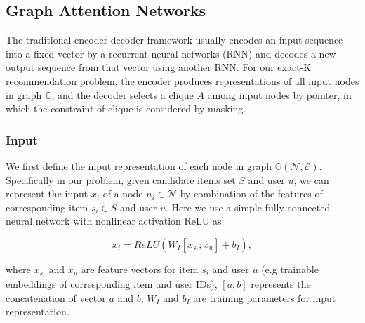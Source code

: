 \subsection{Graph Attention Networks}
\label{sec:gattn}
The traditional encoder-decoder framework \cite{sutskever2014sequence} usually encodes an input sequence into a fixed vector by a recurrent neural networks (RNN)
and decodes a new output sequence from that vector using another RNN. 
For our exact-K recommendation problem, the encoder produces representations of all input nodes in graph $\mathbb{G}$, 
and the decoder selects a clique $A$ among input nodes by pointer, in which the constraint of clique is considered by masking.

\subsubsection{Input}
\label{sec:input}
We first define the input representation of each node in graph $\mathbb{G}(\mathcal{N},\mathcal{E})$.
Specifically in our problem, given candidate items set $S$ and user $u$,
we can represent the input $x_i$ of a node $n_i\in \mathcal{N}$ by combination of the features of corresponding item $s_i\in S$ and user $u$.
Here we use a simple fully connected neural network with nonlinear activation ReLU as:
\begin{small}
\begin{equation}
	x_i=ReLU(W_I[x_{s_i};x_u]+b_I),
\end{equation}
\end{small}
where $x_{s_i}$ and $x_u$ are feature vectors for item $s_i$ and user $u$ (e.g trainable embeddings of corresponding item and user IDs), $[a;b]$ represents the concatenation of vector $a$ and $b$, $W_I$ and $b_I$ are training parameters for input representation.

